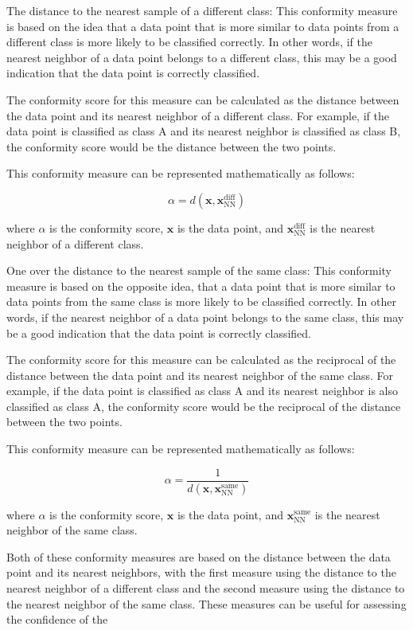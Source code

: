 \documentclass{article}
\theoremstyle{mytheoremstyle}
\theoremstyle{mytheoremstyle}
\theoremstyle{myproblemstyle}
\begin{document}
The distance to the nearest sample of a different class: This conformity measure is based on the idea that a data point that is more similar to data points from a different class is more likely to be classified correctly. In other words, if the nearest neighbor of a data point belongs to a different class, this may be a good indication that the data point is correctly classified.

The conformity score for this measure can be calculated as the distance between the data point and its nearest neighbor of a different class. For example, if the data point is classified as class A and its nearest neighbor is classified as class B, the conformity score would be the distance between the two points.

This conformity measure can be represented mathematically as follows:

$$ \alpha = d(\mathbf{x}, \mathbf{x}_\text{NN}^\text{diff}) $$

where $\alpha$ is the conformity score, $\mathbf{x}$ is the data point, and $\mathbf{x}_\text{NN}^\text{diff}$ is the nearest neighbor of a different class.

One over the distance to the nearest sample of the same class: This conformity measure is based on the opposite idea, that a data point that is more similar to data points from the same class is more likely to be classified correctly. In other words, if the nearest neighbor of a data point belongs to the same class, this may be a good indication that the data point is correctly classified.

The conformity score for this measure can be calculated as the reciprocal of the distance between the data point and its nearest neighbor of the same class. For example, if the data point is classified as class A and its nearest neighbor is also classified as class A, the conformity score would be the reciprocal of the distance between the two points.

This conformity measure can be represented mathematically as follows:

$$ \alpha = \frac{1}{d(\mathbf{x}, \mathbf{x}_\text{NN}^\text{same})} $$

where $\alpha$ is the conformity score, $\mathbf{x}$ is the data point, and $\mathbf{x}_\text{NN}^\text{same}$ is the nearest neighbor of the same class.

Both of these conformity measures are based on the distance between the data point and its nearest neighbors, with the first measure using the distance to the nearest neighbor of a different class and the second measure using the distance to the nearest neighbor of the same class. These measures can be useful for assessing the confidence of the
\end{document}
